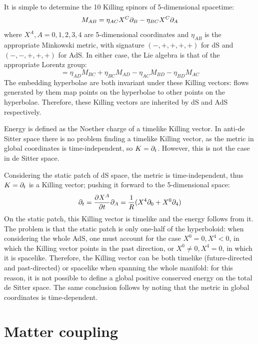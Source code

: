 It is simple to determine the 10 Killing spinors of 5-dimensional spacetime:
\begin{equation*}
  M_{AB} = \eta_{AC} X^C \partial_B - \eta_{BC} X^C \partial_A
\end{equation*}
where $ X^A, A = 0,1,2,3,4 $ are 5-dimensional coordinates and $ \eta_{AB} $ is the appropriate Minkowski metric, with signature $ (-,+,+,+,+) $ for dS and $ (-,-,+,+,+) $ for AdS. In either case, the Lie algebra is that of the appropriate Lorentz group:
\begin{equation*}
  [M_{AB}, M_{CD}] = \eta_{AD} M_{BC} + \eta_{BC} M_{AD} - \eta_{AC} M_{BD} - \eta_{BD} M_{AC}
\end{equation*}
The embedding hyperbolae are both invariant under these Killing vectors: flows generated by them map points on the hyperbolae to other points on the hyperbolae. Therefore, these Killing vectors are inherited by dS and AdS respectively.

Energy is defined as the Noether charge of a timelike Killing vector. In anti-de Sitter space there is no problem finding a timelike Killing vector, as the metric in global coordinates  is time-independent, so $ K = \partial_t $. However, this is not the case in de Sitter space.

Considering the static patch of dS space, the metric  is time-independent, thus $ K = \partial_t $ is a Killing vector; pushing it forward to the 5-dimensional space:
\begin{equation*}
  \partial_t = \frac{\partial X^A}{\partial t} \partial_A = \frac{1}{R} ( X^4 \partial_0 + X^0 \partial_4 )
\end{equation*}
On the static patch, this Killing vector is timelike and the energy  follows from it. The problem is that the static patch is only one-half of the hyperboloid: when considering the whole AdS, one must account for the case $ X^0 = 0, X^4 < 0 $, in which the Killing vector points in the past direction, or $ X^0 \neq 0, X^4 = 0 $, in which it is spacelike. Therefore, the Killing vector can be both timelike (future-directed and past-directed) or spacelike when spanning the whole manifold: for this reason, it is not possible to define a global positive conserved energy on the total de Sitter space. The same conclusion follows by noting that the metric in global coordinates  is time-dependent. 

\section{Matter coupling}

